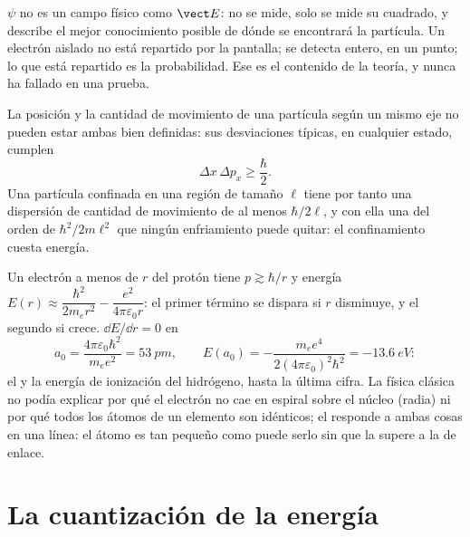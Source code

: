 \begin{remark}\label{rem:b1:quantum-introduction:whatwaves}
$\psi$ no es un campo físico como $\vect E$: no se mide, solo se mide su
cuadrado, y describe el mejor conocimiento posible de dónde se
encontrará la partícula. Un electrón aislado no está repartido por la
pantalla; se detecta entero, en un punto; lo que está repartido es la
probabilidad. Ese es el contenido de la teoría, y nunca ha fallado en
una prueba.
\end{remark}

\begin{theorem}\label{thm:b1:quantum-introduction:heisenberg}
La posición y la cantidad de movimiento de una partícula según un mismo
eje no pueden estar ambas bien definidas: sus desviaciones típicas, en
cualquier estado, cumplen
\[
\Delta x\,\Delta p_x \geq \frac{\hbar}{2} .
\]
Una partícula confinada en una región de tamaño $\ell$ tiene por tanto
una dispersión de cantidad de movimiento de al menos $\hbar/2\ell$, y
con ella una  del orden de $\hbar^2/2m\ell^2$ que ningún
enfriamiento puede quitar: el confinamiento cuesta energía.
\end{theorem}
\admitted

\begin{example}\label{ex:b1:quantum-introduction:hsize}
Un electrón a menos de $r$ del protón tiene $p \gtrsim \hbar/r$ y energía
$E(r) \approx \dfrac{\hbar^2}{2m_er^2} - \dfrac{e^2}{4\pi\varepsilon_0r}$: el primer
término se dispara si $r$ disminuye, y el segundo si crece. $\dd E/\dd r = 0$ en
\[
a_0 = \frac{4\pi\varepsilon_0\hbar^2}{m_ee^2} = \qty{53}{pm} , \qquad
E(a_0) = -\frac{m_ee^4}{2(4\pi\varepsilon_0)^2\hbar^2} = \qty{-13.6}{eV} :
\]
el \emph{} y la energía de ionización del hidrógeno, hasta
la última cifra. La física clásica no podía explicar por qué el electrón
no cae en espiral sobre el núcleo (radia) ni por qué todos los átomos de
un elemento son idénticos; el  responde a
ambas cosas en una línea: el átomo es tan pequeño como puede serlo sin
que la  supere a la de enlace.
\end{example}

\section{La cuantización de la energía}

